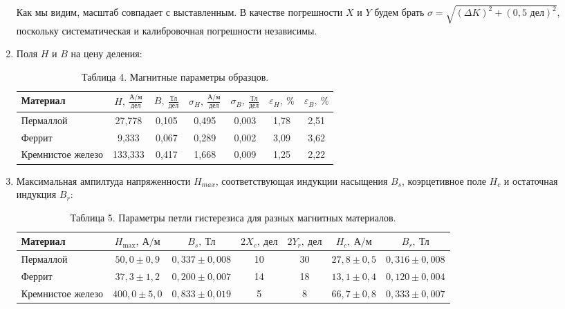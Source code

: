 \documentclass[a4paper]{article}
\begin{document}
\begin{enumerate}
Как мы видим, масштаб совпадает с выставленным. В качестве погрешности $X$ и $Y$ будем брать $\sigma = \sqrt{(\Delta K)^2 + (0,5 \text{ дел})^2}$, поскольку систематическая и калибровочная погрешности независимы.

\item Поля $H$ и $B$ на цену деления:
\begin{table}[h!]
    \centering
    \begin{tabular}{|l|c|c|c|c|c|c|}
        \hline
        Материал & $H,\ \frac{\text{А/м}}{\text{дел}}$ & $B,\ \frac{\text{Тл}}{\text{дел}}$ & $\sigma_H,\ \frac{\text{А/м}}{\text{дел}}$ & $\sigma_B,\ \frac{\text{Тл}}{\text{дел}}$ & $\varepsilon_H,\ \%$ & $\varepsilon_B,\ \%$ \\ \hline
        Пермаллой & 27{,}778 & 0{,}105 & 0{,}495 & 0{,}003 & 1{,}78 & 2{,}51 \\ \hline
        Феррит & 9{,}333 & 0{,}067 & 0{,}289 & 0{,}002 & 3{,}09 & 3{,}62 \\ \hline
        Кремнистое железо & 133{,}333 & 0{,}417 & 1{,}668 & 0{,}009 & 1{,}25 & 2{,}22 \\ \hline
    \end{tabular}
    \caption{Таблица 4. Магнитные параметры образцов.}
    \label{tab:magnetic_params}
\end{table}

\item Максимальная ампилтуда напряженности $H_{max}$, соответствующая индукции насыщения $B_s$, коэрцетивное поле $H_c$ и остаточная индукция $B_r$:

\begin{table}[h!]
    \centering
    \begin{tabular}{|l|c|c|c|c|c|c|}
        \hline
        Материал & $H_{\max},\ \text{А/м}$ & $B_s,\ \text{Тл}$ & $2X_c,\ \text{дел}$ & $2Y_r,\ \text{дел}$ & $H_c,\ \text{А/м}$ & $B_r,\ \text{Тл}$ \\ \hline
        Пермаллой & $50{,}0 \pm 0{,}9$ & $0{,}337 \pm 0{,}008$ & 10 & 30 & $27{,}8 \pm 0{,}5$ & $0{,}316 \pm 0{,}008$ \\ \hline
        Феррит & $37{,}3 \pm 1{,}2$ & $0{,}200 \pm 0{,}007$ & 14 & 18 & $13{,}1 \pm 0{,}4$ & $0{,}120 \pm 0{,}004$ \\ \hline
        Кремнистое железо & $400{,}0 \pm 5{,}0$ & $0{,}833 \pm 0{,}019$ & 5 & 8 & $66{,}7 \pm 0{,}8$ & $0{,}333 \pm 0{,}007$ \\ \hline
    \end{tabular}
    \caption{Таблица 5. Параметры петли гистерезиса для разных магнитных материалов.}
    \label{tab:hysteresis_params}
\end{table}



\end{enumerate}
\end{document}
